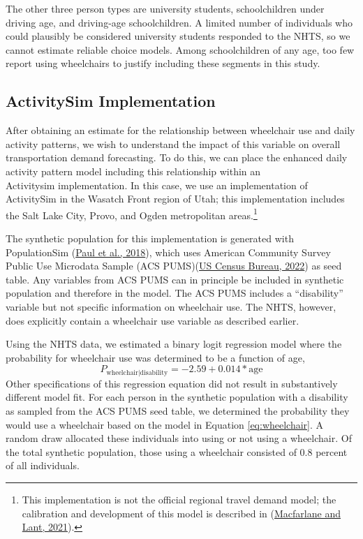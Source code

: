 \documentclass[3p, authoryear, review]{elsarticle} %
\begin{document}
The other three person types are university students, schoolchildren under
driving age, and driving-age schoolchildren. A limited number of individuals who
could plausibly be considered university students responded to the NHTS, so we
cannot estimate reliable choice models. Among schoolchildren of any age, too few
report using wheelchairs to justify including these segments in this study.

\hypertarget{activitysim-implementation}{%
\subsection{ActivitySim Implementation}\label{activitysim-implementation}}

After obtaining an estimate for the relationship between wheelchair use and
daily activity patterns, we wish to understand the impact of this variable on
overall transportation demand forecasting. To do this, we can place the
enhanced daily activity pattern model including this relationship within an\\
Activitysim implementation. In this case, we use an implementation of ActivitySim
in the Wasatch Front region of Utah; this implementation includes the Salt Lake
City, Provo, and Ogden metropolitan areas.\footnote{This implementation is not the
  official regional travel demand model; the calibration and development of this
  model is described in (\protect\hyperlink{ref-udotwheelchairs}{Macfarlane and Lant, 2021}).}

The synthetic population for this implementation is generated with PopulationSim
(\protect\hyperlink{ref-paul2018}{Paul et al., 2018}), which uses American Community Survey Public Use Microdata Sample
(ACS PUMS)(\protect\hyperlink{ref-acspums}{US Census Bureau, 2022}) as seed table. Any variables from ACS PUMS can in principle
be included in synthetic population and therefore in the model. The ACS PUMS
includes a ``disability'' variable but not specific information on wheelchair use.
The NHTS, however, does explicitly contain a wheelchair use variable as
described earlier.

Using the NHTS data, we estimated a binary logit regression model where the
probability for wheelchair use was determined to be a function of age,
\begin{equation}
  P_{\mathrm{wheelchair | disability}}=-2.59 + 0.014*\mathrm{age}
  \label{eq:wheelchair}
\end{equation}
Other specifications of this regression equation did not result in substantively
different model fit. For each person in the synthetic population with a disability
as sampled from the ACS PUMS seed table, we determined the probability they
would use a wheelchair based on the model in Equation \eqref{eq:wheelchair}. A random
draw allocated these individuals into using or not using a wheelchair.
Of the total synthetic population, those using a wheelchair consisted of 0.8
percent of all individuals.
\end{document}
